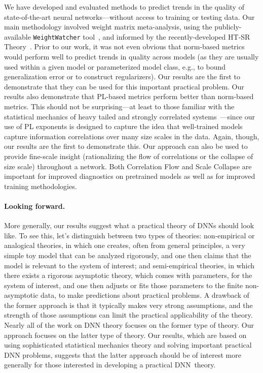 We have developed and evaluated methods to predict trends in the quality of state-of-the-art neural networks---without access to training or testing data.
Our main methodology involved weight matrix meta-analysis, using the publicly-available \texttt{WeightWatcher} tool~\cite{weightwatcher_package}, and informed by the recently-developed HT-SR Theory~\cite{MM18_TR, MM19_HTSR_ICML, MM20_SDM}.
Prior to our work, it was not even obvious that norm-based metrics would perform well to predict trends in quality across models (as they are usually used within a given model or parameterized model class, e.g., to bound generalization error or to construct regularizers).
Our results are the first to demonstrate that they can be used for this important practical problem.
Our results also demonstrate that PL-based metrics perform better than norm-based metrics. 
This should not be surprising---at least to those familiar with the statistical mechanics of heavy tailed and strongly correlated systems~\cite{BouchaudPotters03, SornetteBook, BP11, bun2017}---since our use of PL exponents is designed to capture the idea that well-trained models capture information correlations over many size scales in the data.
Again, though, our results are the first to demonstrate this.
Our approach can also be used to provide fine-scale insight (rationalizing the flow of correlations or the collapse of size scale) throughout a network. 
Both Correlation Flow and Scale Collapse are important for improved diagnostics on pretrained models as well as for improved training methodologies.


\paragraph{Looking forward.}

More generally, our results suggest what a practical theory of DNNs should look like.
To see this, let's distinguish between two types of theories:
non-empirical or analogical theories, in which one creates, often from general principles, a very simple toy model that can be analyzed rigorously, and one then claims that the model is relevant to the system of interest; and 
semi-empirical theories, in which there exists a rigorous asymptotic theory, which comes with parameters, for the system of interest, and one then adjusts or fits those parameters to the finite non-asymptotic data, to make predictions about practical problems.
A drawback of the former approach is that it typically makes very strong assumptions, and the strength of those assumptions can limit the practical applicability of the theory.
Nearly all of the work on DNN theory focuses on the former type of theory.
Our approach focuses on the latter type of theory.
Our results, which are based on using sophisticated statistical mechanics theory and solving important practical DNN problems, suggests that the latter approach should be of interest more generally for those interested in developing a practical DNN~theory.


